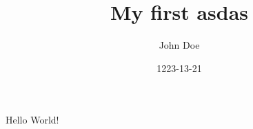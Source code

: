 \documentclass{article}
\title{My first asdas}
\date{1223-13-21}
\author{John Doe}
\begin{document}
  Hello World!
\end{document}
